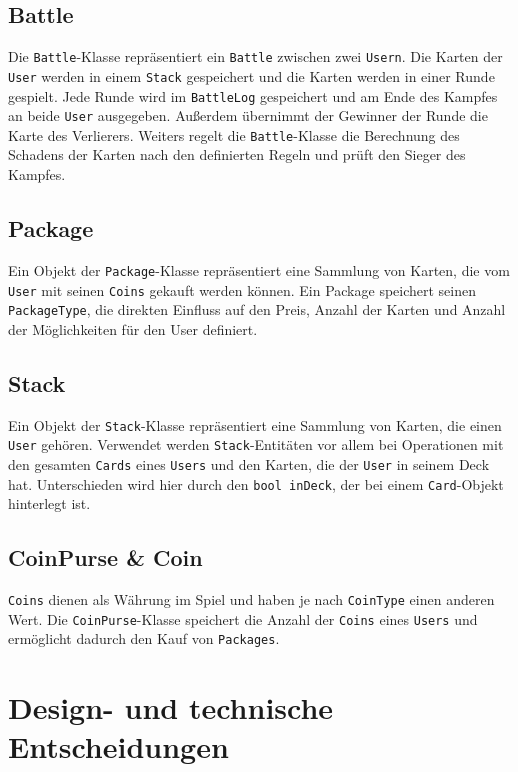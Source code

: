 \documentclass[a4paper, 12pt]{article}
\begin{document}
\subsection{Battle}
Die \texttt{Battle}-Klasse repräsentiert ein \texttt{Battle} zwischen zwei \texttt{Usern}. Die Karten der \texttt{User} werden in einem \texttt{Stack} gespeichert und die Karten werden in einer Runde gespielt.
Jede Runde wird im \texttt{BattleLog} gespeichert und am Ende des Kampfes an beide \texttt{User} ausgegeben. Außerdem übernimmt der Gewinner der Runde die Karte des Verlierers.
Weiters regelt die \texttt{Battle}-Klasse die Berechnung des Schadens der Karten nach den definierten Regeln und prüft den Sieger des Kampfes.

\subsection{Package}
Ein Objekt der \texttt{Package}-Klasse repräsentiert eine Sammlung von Karten, die vom \texttt{User} mit seinen \texttt{Coins} gekauft werden können.
Ein Package speichert seinen \texttt{PackageType}, die direkten Einfluss auf den Preis, Anzahl der Karten und Anzahl der Möglichkeiten für den User definiert.

\subsection{Stack}
Ein Objekt der \texttt{Stack}-Klasse repräsentiert eine Sammlung von Karten, die einen \texttt{User} gehören. Verwendet werden \texttt{Stack}-Entitäten vor allem bei Operationen
mit den gesamten \texttt{Cards} eines \texttt{Users} und den Karten, die der \texttt{User} in seinem Deck hat. Unterschieden wird hier durch den \texttt{bool inDeck}, der bei einem \texttt{Card}-Objekt hinterlegt ist.

\subsection{CoinPurse \& Coin}
\texttt{Coins} dienen als Währung im Spiel und haben je nach \texttt{CoinType} einen anderen Wert. Die \texttt{CoinPurse}-Klasse speichert die Anzahl der \texttt{Coins} eines \texttt{Users} und ermöglicht dadurch den Kauf von \texttt{Packages}.

\section{Design- und technische Entscheidungen}
\end{document}
